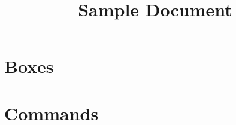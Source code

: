 \documentclass[nodate]{mszreport}
\title{Sample Document}
\begin{document}
\maketitle

\chapter{Boxes}

\chapter{Commands}
\end{document}
